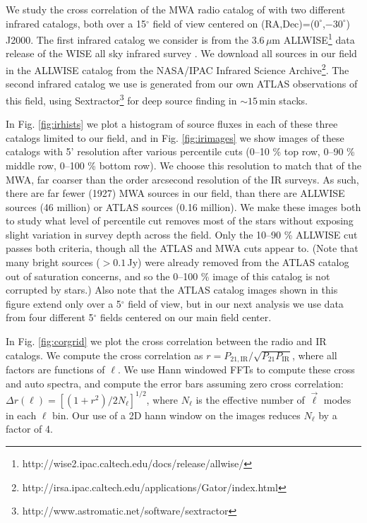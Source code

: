 \documentclass{emulateapj}
\newcommand{\ir}{\text{IR}}
\begin{document}
We study the cross correlation of the MWA radio catalog of \citet{PattiCatalog1} with two different infrared catalogs, both over a 15$^\circ$ field of view centered on (RA,Dec)=($0^\circ$,$-30^\circ$) J2000. The first infrared catalog we consider is from the 3.6\,$\mu$m ALLWISE\footnote{http://wise2.ipac.caltech.edu/docs/release/allwise/} data release of the WISE all sky infrared survey \citep{Wright2010}. We download all sources in our field in the ALLWISE catalog from the NASA/IPAC Infrared Science Archive\footnote{http://irsa.ipac.caltech.edu/applications/Gator/index.html}. The second infrared catalog we use is generated from our own ATLAS observations of this field, using Sextractor\footnote{http://www.astromatic.net/software/sextractor} \citep{sextractor} for deep source finding in $\sim15$\,min stacks. 

In Fig. \ref{fig:irhists} we plot a histogram of source fluxes in each of these three catalogs limited to our field, and in Fig. \ref{fig:irimages} we show images of these catalogs with 5' resolution after various percentile cuts (0--10 \% top row, 0--90 \% middle row, 0--100 \% bottom row). We choose this resolution to match that of the MWA, far coarser than the order arcsecond resolution of the IR surveys. As such, there are far fewer (1927) MWA sources in our field, than there are ALLWISE sources (46 million) or ATLAS sources (0.16 million). We make these images both to study what level of percentile cut removes most of the stars without exposing slight variation in survey depth across the field. Only the 10--90 \% ALLWISE cut passes both criteria, though all the ATLAS and MWA cuts appear to. (Note that many bright sources ($>0.1$\,Jy) were already removed from the ATLAS catalog out of saturation concerns, and so the 0--100 \% image of this catalog is not corrupted by stars.) Also note that the ATLAS catalog images shown in this figure extend only over a 5$^\circ$ field of view, but in our next analysis we use data from four different 5$^\circ$ fields centered on our main field center.






In Fig. \ref{fig:corgrid} we plot the cross correlation between the radio and IR catalogs. We compute the cross correlation as $r=P_{21,\ir}/\sqrt{P_{21}P_{\ir}}$, where all factors are functions of $\ell$. We use Hann windowed FFTs to compute these cross and auto spectra, and compute the error bars assuming zero cross correlation: $\Delta r(\ell) = [(1+r^2)/2N_\ell]^{1/2}$, where $N_\ell$ is the effective number of $\vec{\ell}$ modes in each $\ell$ bin. Our use of a 2D hann window on the images reduces $N_\ell$ by a factor of 4.
\end{document}
